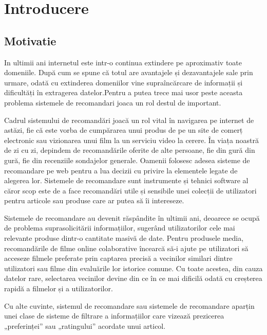 \chapter{Introducere }
\section{Motivatie}
\label{sec:ch3sec1}

\par In ultimii ani internetul este intr-o continua extindere pe aproximativ toate domeniile. După cum se spune că totul are avantajele și dezavantajele sale prin urmare, odată cu extinderea domeniilor  vine supraîncărcare de informații și dificultăți în extragerea datelor.Pentru a putea trece mai usor peste aceasta problema sistemele de recomandari joaca un rol destul de important.
\par Cadrul sistemului de recomandări joacă un rol vital în navigarea pe internet de astăzi, fie că este vorba de cumpărarea unui produs de pe un site de comerț electronic sau vizionarea unui film la un serviciu video la cerere. În viața noastră de zi cu zi, depindem de recomandările oferite de alte persoane, fie din gură din gură, fie din recenziile sondajelor generale. Oamenii folosesc adesea sisteme de recomandare pe web pentru a lua decizii cu privire la elementele legate de alegerea lor. Sistemele de recomandare sunt instrumente și tehnici software al căror scop este de a face recomandări utile și sensibile unei colecții de utilizatori pentru articole sau produse care ar putea să îi intereseze. 
\par Sistemele de recomandare au devenit răspândite în ultimii ani, deoarece se ocupă de problema suprasolicitării informațiilor, sugerând utilizatorilor cele mai relevante produse dintr-o cantitate masivă de date. Pentru produsele media, recomandările de filme online colaborative încearcă să-i ajute pe utilizatori să acceseze filmele preferate prin captarea precisă a vecinilor similari dintre utilizatori sau filme din evaluările lor istorice comune. Cu toate acestea, din cauza datelor rare, selectarea vecinilor devine din ce în ce mai dificilă odată cu creșterea rapidă a filmelor și a utilizatorilor.
\par Cu alte cuvinte, sistemul de recomandare sau sistemele de recomandare aparțin unei clase de sisteme de filtrare a informațiilor care vizează prezicerea „preferinței” sau „ratingului” acordate unui articol.